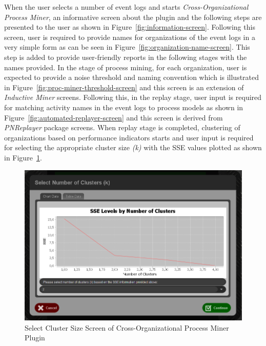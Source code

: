 When the user selects a number of event logs and starts \textit{Cross-Organizational Process Miner}, an informative screen about the plugin and the following steps are presented to the user as shown in Figure~\ref{fig:information-screen}. Following this screen, user is required to provide names for organizations of the event logs in a very simple form as can be seen in Figure~\ref{fig:organization-name-screen}. This step is added to provide user-friendly reports in the following stages with the names provided. In the stage of process mining, for each organization, user is expected  to provide a noise threshold and naming convention which is illustrated in Figure~\ref{fig:proc-miner-threshold-screen} and this screen is an extension of \textit{Inductive Miner} \cite{leemans2014discoveringinfrequent} screens. Following this, in the replay stage, user input is required for matching activity names in the event logs to process models as shown in Figure~\ref{fig:automated-replayer-screen} and this screen is derived from \textit{PNReplayer} package \cite{adriansyah2011towards} screens. When replay stage is completed, clustering of organizations based on performance indicators starts and user input is required for selecting the appropriate cluster size \textit{(k)} with the SSE values plotted as shown in Figure~\ref{fig:select-cluster-size-screen}. 
\begin{figure}
	\centering
	\includegraphics[width=\textwidth]{4_methodology/select-cluster-size-screen}
	\caption{ Select Cluster Size Screen of Cross-Organizational Process Miner Plugin}
  \label{fig:select-cluster-size-screen}
\end{figure}

